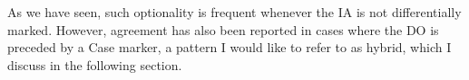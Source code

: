 \documentclass[output=paper]{langsci/langscibook}
\begin{document}
As we have seen, such optionality is frequent whenever the IA is not differentially marked. However, agreement has also been reported in cases where the DO is preceded by a Case marker, a pattern I would like to refer to as hybrid, which I discuss in the following section.
% 
% 
% 
% 
% 
% 
%  
% 
% 
%  
% 
% 
\end{document}

